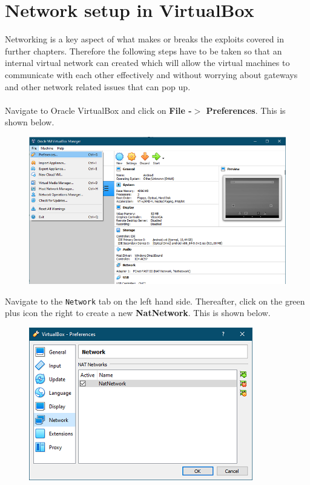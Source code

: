 \documentclass[a4paper, 12pt, titlepage]{report}
\begin{document}
\section{Network setup in VirtualBox}
Networking is a key aspect of what makes or breaks the exploits covered in further chapters. Therefore the following steps have to be taken so that an internal virtual network can created which will allow the virtual machines to communicate with each other effectively and without worrying about gateways and other network related issues that can pop up.\\\\
Navigate to Oracle VirtualBox and click on \textbf{File -$>$ Preferences}. This is shown below.
\begin{figure}[H]
    \centering
    \includegraphics[scale=0.8]{pics/net1.png}
\end{figure}
Navigate to the \texttt{Network} tab on the left hand side. Thereafter, click on the green plus icon the right to create a new \textbf{NatNetwork}. This is shown below.
\begin{figure}[H]
    \centering
    \includegraphics[scale=1]{pics/net2.png}
\end{figure}
\end{document}
